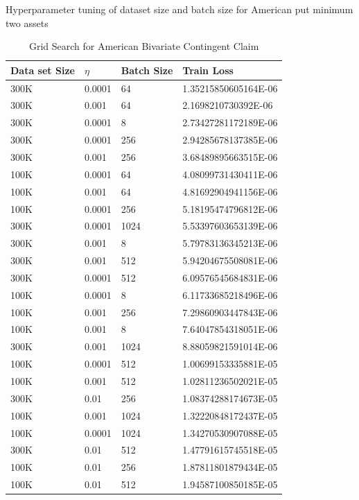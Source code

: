 \begin{table}[H]
\caption{Grid Search for American Bivariate Contingent Claim}{Hyperparameter tuning of dataset size and batch size for American put minimum two assets}
\label{tab:fullhyperAmerMin4}
\centering
\begin{tabular}{llll}
\toprule
\textbf{Data set Size} & \textbf{$\eta$} & \textbf{Batch Size} & \textbf{Train Loss} \\
\midrule
300K     & 0.0001 & 64   & 1.35215850605164E-06 \\ 
300K     & 0.001 & 64   & 2.1698210730392E-06 \\ 
300K     & 0.0001 & 8    & 2.73427281172189E-06 \\ 
300K     & 0.0001 & 256  & 2.94285678137385E-06 \\ 
300K     & 0.001 & 256  & 3.68489895663515E-06 \\ 
100K     & 0.0001 & 64   & 4.08099731430411E-06 \\ 
100K     & 0.001 & 64   & 4.81692904941156E-06 \\ 
100K     & 0.0001 & 256  & 5.18195474796812E-06 \\ 
300K     & 0.0001 & 1024  & 5.53397603653139E-06 \\ 
300K     & 0.001 & 8    & 5.79783136345213E-06 \\ 
300K     & 0.001 & 512  & 5.94204675508081E-06 \\ 
300K     & 0.0001 & 512  & 6.09576545684831E-06 \\ 
100K     & 0.0001 & 8    & 6.11733685218496E-06 \\ 
100K     & 0.001 & 256  & 7.29860903447843E-06 \\ 
100K     & 0.001 & 8    & 7.64047854318051E-06 \\ 
300K     & 0.001 & 1024  & 8.88059821591014E-06 \\ 
100K     & 0.0001 & 512  & 1.00699153335881E-05 \\ 
100K     & 0.001 & 512  & 1.02811236502021E-05 \\ 
300K     & 0.01  & 256  & 1.08374288174673E-05 \\ 
100K     & 0.001 & 1024  & 1.32220848172437E-05 \\ 
100K     & 0.0001 & 1024  & 1.34270530907088E-05 \\ 
300K     & 0.01  & 512  & 1.47791615745518E-05 \\ 
100K     & 0.01  & 256  & 1.87811801879434E-05 \\ 
100K     & 0.01  & 512  & 1.94587100850185E-05 \\ 

\end{tabular}
\end{table}
